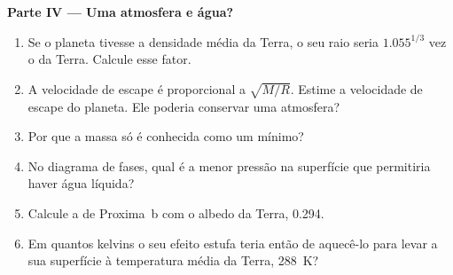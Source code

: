 \begin{problem}
\medskip
\noindent\textbf{Parte IV --- Uma atmosfera e água?}
\begin{enumerate}[resume]
  \item Se o planeta tivesse a densidade média da Terra, o seu raio seria
        $1.055^{1/3}$ vez o da Terra. Calcule esse fator.
  \item A velocidade de escape é proporcional a $\sqrt{M/R}$. Estime a
        velocidade de escape do planeta. Ele poderia conservar uma
        atmosfera?
  \item Por que a massa só é conhecida como um mínimo?
  \item No diagrama de fases, qual é a menor pressão na superfície que
        permitiria haver água líquida?
  \item Calcule a  de Proxima~b com o albedo da
        Terra, 0.294.
  \item Em quantos kelvins o seu efeito estufa teria então de aquecê-lo
        para levar a sua superfície à temperatura média da Terra,
        \qty{288}{K}?
\end{enumerate}
\end{problem}

